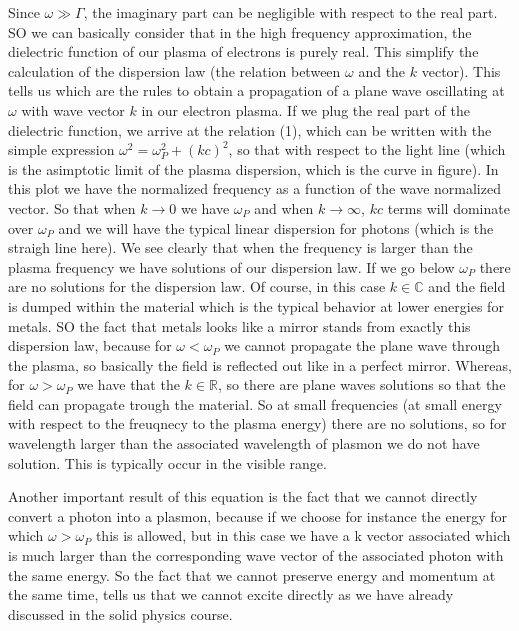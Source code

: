 \documentclass[../main/main.tex]{subfiles}
\begin{document}
Since \( \omega \gg \Gamma  \), the imaginary part can be negligible with respect to the real part. SO we can basically consider that in the high frequency approximation, the dielectric function of our plasma of electrons is purely real. This simplify the calculation of the dispersion law (the relation between \( \omega  \) and the \( k \) vector). This tells us which are the rules to obtain a propagation of a plane wave oscillating at \( \omega  \) with wave vector \( k \) in our electron plasma. If we plug the real part of the dielectric function, we arrive at the relation (1), which can be written with the simple expression \( \omega ^2 = \omega _P^2 + (kc)^2 \), so that with respect to the light line (which is the asimptotic limit of the plasma dispersion, which is the curve in figure). In this plot we have the normalized frequency as a function of the wave normalized vector. So that when \( k \rightarrow 0 \) we have \( \omega _P \) and when \( k \rightarrow \infty  \), \( kc \) terms will dominate over \( \omega _P \) and we will have the typical linear dispersion for photons (which is the straigh line here). We see clearly that when the frequency is larger than the plasma frequency we have solutions of our dispersion law. If we go below \( \omega _P \) there are no solutions for the dispersion law. Of course, in this case \( k \in \mathbb{C} \)
and the field is dumped within the material which is the typical behavior at lower energies for metals. SO the fact that metals looks like a mirror stands from exactly this dispersion law, because for \( \omega < \omega _P \) we cannot propagate the plane wave through the plasma, so basically the field is reflected out like in a perfect mirror. Whereas, for \( \omega > \omega _P \) we have that the \( k \in \mathbb{R} \), so there are plane waves solutions so that the field can propagate trough the material. So at small frequencies (at small energy with respect to the freuqnecy to the plasma energy) there are no solutions, so for wavelength larger than the associated wavelength of plasmon we do not have solution. This is typically occur in the visible range.

Another important result of this equation is the fact that we cannot directly convert a photon into a plasmon, because if we choose for instance the energy for which \( \omega > \omega _P \) this is allowed, but in this case we have a k vector associated which is much larger than the corresponding wave vector of the associated photon with the same energy. So the fact that we cannot preserve energy and momentum at the same time, tells us that we cannot excite directly as we have already discussed in the solid physics course.
\end{document}
